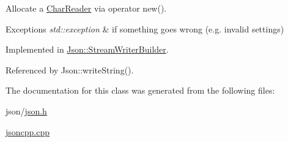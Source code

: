 Allocate a \hyperlink{classJson_1_1CharReader}{Char\+Reader} via operator new(). 


\begin{DoxyExceptions}{Exceptions}
{\em std\+::exception} & if something goes wrong (e.\+g. invalid settings) \\
\hline
\end{DoxyExceptions}


Implemented in \hyperlink{classJson_1_1StreamWriterBuilder_ab9ee278609f88ae04a7c1a84e1f559e6_ab9ee278609f88ae04a7c1a84e1f559e6}{Json\+::\+Stream\+Writer\+Builder}.



Referenced by Json\+::write\+String().



The documentation for this class was generated from the following files\+:\begin{DoxyCompactItemize}
\item 
json/\hyperlink{json_8h}{json.\+h}\item 
\hyperlink{jsoncpp_8cpp}{jsoncpp.\+cpp}\end{DoxyCompactItemize}
